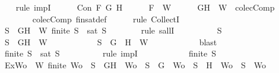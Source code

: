 \begin{isabellebody}
\ \ \isamarkupfalse%
\ {\isacharparenleft}rule\ impI{\isacharparenright}{\isacharplus}\isanewline
\ \ \ \ \isamarkupfalse%
\ {\isachardoublequoteopen}Con\ F\ G\ H{\isachardoublequoteclose}\isanewline
\ \ \ \ \isamarkupfalse%
\ {\isachardoublequoteopen}F\ {\isasymin}\ W{\isachardoublequoteclose}\isanewline
\ \ \ \ \isamarkupfalse%
\ {\isachardoublequoteopen}{\isacharbraceleft}G{\isacharcomma}H{\isacharbraceright}\ {\isasymunion}\ W\ {\isasymin}\ colecComp{\isachardoublequoteclose}\isanewline
\ \ \ \ \ \ \isamarkupfalse%
\ colecComp\ fin{\isacharunderscore}sat{\isacharunderscore}def\isanewline
\ \ \ \ \isamarkupfalse%
\ {\isacharparenleft}rule\ CollectI{\isacharparenright}\isanewline
\ \ \ \ \ \ \isamarkupfalse%
\ {\isachardoublequoteopen}{\isasymforall}S\ {\isasymsubseteq}\ {\isacharbraceleft}G{\isacharcomma}H{\isacharbraceright}\ {\isasymunion}\ W{\isachardot}\ finite\ S\ {\isasymlongrightarrow}\ sat\ S{\isachardoublequoteclose}\isanewline
\ \ \ \ \ \ \isamarkupfalse%
\ {\isacharparenleft}rule\ sallI{\isacharparenright}\isanewline
\ \ \ \ \ \ \ \ \isamarkupfalse%
\ S\isanewline
\ \ \ \ \ \ \ \ \isamarkupfalse%
\ {\isachardoublequoteopen}S\ {\isasymsubseteq}\ {\isacharbraceleft}G{\isacharcomma}H{\isacharbraceright}\ {\isasymunion}\ W{\isachardoublequoteclose}\isanewline
\ \ \ \ \ \ \ \ \isamarkupfalse%
\ \isamarkupfalse%
\ {\isachardoublequoteopen}S\ {\isasymsubseteq}\ {\isacharbraceleft}G{\isacharbraceright}\ {\isasymunion}\ {\isacharparenleft}{\isacharbraceleft}H{\isacharbraceright}\ {\isasymunion}\ W{\isacharparenright}{\isachardoublequoteclose}\isanewline
\ \ \ \ \ \ \ \ \ \ \isamarkupfalse%
\ blast\ \isanewline
\ \ \ \ \ \ \ \ \isamarkupfalse%
\ {\isachardoublequoteopen}finite\ S\ {\isasymlongrightarrow}\ sat\ S{\isachardoublequoteclose}\isanewline
\ \ \ \ \ \ \ \ \isamarkupfalse%
\ {\isacharparenleft}rule\ impI{\isacharparenright}\isanewline
\ \ \ \ \ \ \ \ \ \ \isamarkupfalse%
\ {\isachardoublequoteopen}finite\ S{\isachardoublequoteclose}\ \isanewline
\ \ \ \ \ \ \ \ \ \ \isamarkupfalse%
\ Ex{\isacharcolon}{\isachardoublequoteopen}{\isasymexists}Wo\ {\isasymsubseteq}\ W{\isachardot}\ finite\ Wo\ {\isasymand}\ {\isacharparenleft}S\ {\isacharequal}\ {\isacharbraceleft}G{\isacharcomma}H{\isacharbraceright}\ {\isasymunion}\ Wo\ {\isasymor}\ S\ {\isacharequal}\ {\isacharbraceleft}G{\isacharbraceright}\ {\isasymunion}\ Wo\ {\isasymor}\ S\ {\isacharequal}\ {\isacharbraceleft}H{\isacharbraceright}\ {\isasymunion}\ Wo\ {\isasymor}\ S\ {\isacharequal}\ Wo{\isacharparenright}{\isachardoublequoteclose}\isanewline

\end{isabellebody}
